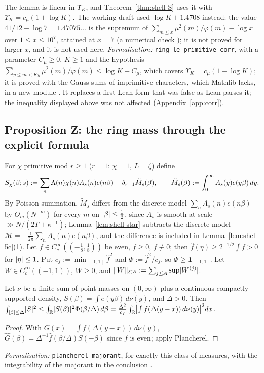 The lemma is linear in $\Upsilon_K$, and Theorem~\ref{thm:shell-S} uses it with $\Upsilon_K=c_\mu(1+\log K)$. The working draft used $\log K+1.4708$ instead: the
value $41/12-\log7=1.47075\ldots$ is the supremum of $\sum_{m\le x}\mu^2(m)/\varphi(m)-\log x$ over $1\le x\le10^7$, attained at $x=7$ (a numerical check \tagN);
it is not proved for larger $x$, and it is not used here. \emph{Formalisation:} \texttt{ring\_le\_primitive\_corr}, with a parameter $C_\mu\ge0$, $K\ge1$ and the
hypothesis $\sum_{y\le m<Ky}\mu^2(m)/\varphi(m)\le\log K+C_\mu$, which covers $\Upsilon_K=c_\mu(1+\log K)$; it is proved with the
Gauss sums of imprimitive characters, which Mathlib lacks, in a new module \tagL. It replaces
a first Lean form that was false as Lean parses it; the inequality displayed above was not affected (Appendix~\ref{app:corr}).

\subsection{Proposition Z: the ring mass through the explicit formula}\label{ssec:shell-propZ}
For $\chi$ primitive mod $r\ge1$ ($r=1$: $\chi=1$, $L=\zeta$) define
\[
S_\chi(\beta;s):=\sum_n\Lambda(n)\chi(n)A_s(n)e(n\beta)-\delta_{r=1}\tilde M_s(\beta),\qquad\tilde M_s(\beta):=\int_0^\infty A_s(y)e(y\beta)\,dy .
\]
By Poisson summation, $\tilde M_s$ differs from the discrete model $\sum_nA_s(n)e(n\beta)$ by $O_m(N^{-m})$ for every $m$ on $\lvert \beta\rvert\le\frac12$, since $A_s$ is
smooth at scale $\gg N/(2T+\kappa^{-1})$; Lemma~\ref{lem:shell-star} subtracts the discrete model $\mathcal M=-\frac1{2\pi}\sum_nA_s(n)e(n\beta)$, and the
difference is included in Lemma~\ref{lem:shell-5c}(1).
Let $f\in C_c^\infty((-\frac18,\frac18))$ be even, $f\ge0$, $f\not\equiv0$; then $\hat f(\eta)\ge2^{-1/2}\int f>0$ for $\lvert \eta\rvert\le1$. Put
$c_f:=\min_{[-1,1]}\hat f^2$ and $\Phi:=\hat f^2/c_f$, so $\Phi\ge\mathbf 1_{[-1,1]}$. Let $W\in C_c^\infty((-1,1))$, $W\ge0$, and
$\lVert W\rVert_{C^A}:=\sum_{j\le A}\sup\lvert W^{(j)}\rvert$.

\begin{lemma}\label{lem:shell-5a}
Let $\nu$ be a finite sum of point masses on $(0,\infty)$ plus a continuous compactly supported density, $S(\beta)=\int e(y\beta)\,d\nu(y)$, and $\Delta>0$.
Then $\int_{\lvert \beta\rvert\le\Delta}\lvert S\rvert^2\le\int_{\mathbb R}\lvert S(\beta)\rvert^2\Phi(\beta/\Delta)\,d\beta=\frac{\Delta^2}{c_f}\int_{\mathbb R}\bigl|\int f(\Delta(y-x))\,d\nu(y)\bigr|^2dx$.
\end{lemma}
\begin{proof}
With $G(x)=\int f(\Delta(y-x))\,d\nu(y)$, $\hat G(\beta)=\Delta^{-1}\hat f(\beta/\Delta)S(-\beta)$ since $f$ is even; apply Plancherel.
\end{proof}
\emph{Formalisation:} \texttt{plancherel\_majorant}, for exactly this class of measures, with the integrability of the majorant in the
conclusion \tagL.

